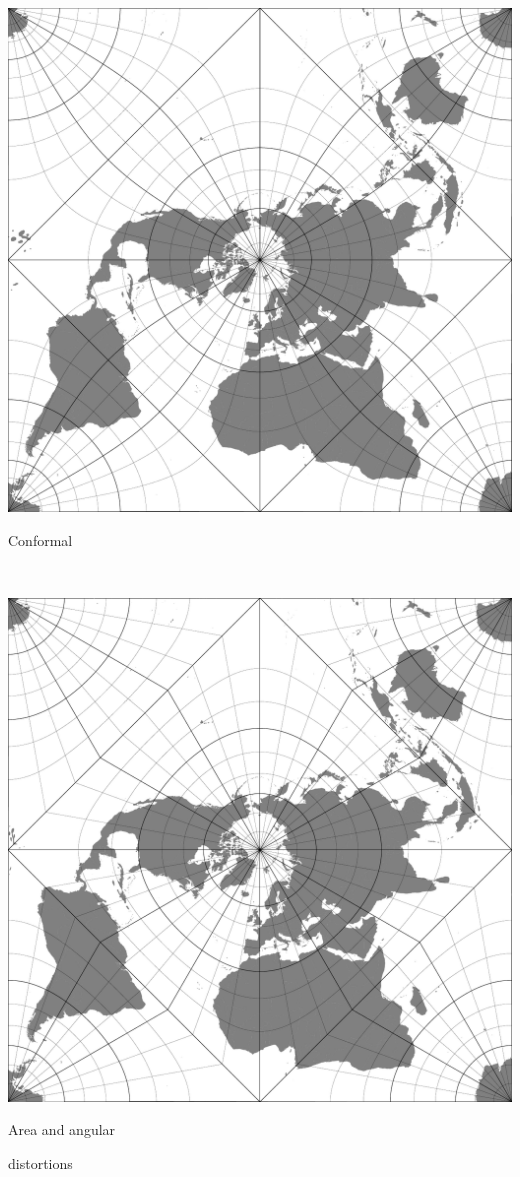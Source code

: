 \documentclass[utf8,stillsansserifmath,fleqn,t]{beamer}
\begin{document}
\begin{frame}
\begin{minipage}{.3\textwidth}
\includegraphics[width=\textwidth]{./fig/world-stg-quinc-conf.pdf}
\centerline{Conformal}
\centerline{~}
\end{minipage}\hfill
\begin{minipage}{.3\textwidth}
\includegraphics[width=\textwidth]{./fig/world-mix-quinc-squircle.pdf}
\centerline{Area and angular}
\centerline{distortions}
\end{minipage}
\end{frame}
\end{document}
